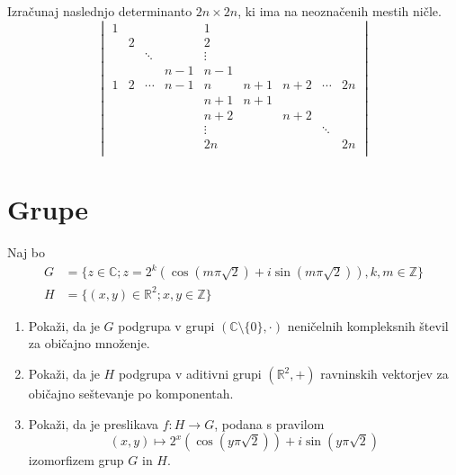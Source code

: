\documentclass[a4paper,12pt]{article}
\begin{document}
Izračunaj naslednjo determinanto \(2n \times 2n\), ki ima na neoznačenih mestih ničle.
\[
\begin{vmatrix}
    1 & & & & 1 & & & & \\
    & 2 & & & 2 & & & & \\
    & & \ddots & & \vdots & & & &\\
    & & & n-1 & n-1 & & &\\
    1 & 2 & \cdots & n-1 & n & n+1 & n+2 & \cdots & 2n \\
    & & & & n+1 & n+1 & & & \\
    & & & & n+2 & & n+2 & & \\
    & & & & \vdots & & & \ddots & \\
    & & & & 2n & & & & 2n \\

\end{vmatrix}
\]
%
%

\section*{Grupe}

Naj bo
\begin{align*}
    G&=\{z \in \mathbb{C}; z=2^k(\cos(m\pi \sqrt{2}) + i\sin(m\pi \sqrt{2})), k, m \in \mathbb{Z}\} \\
    H&=\{(x,y) \in \mathbb{R}^2; x, y \in \mathbb{Z}\}
\end{align*}
\begin{enumerate}
\item
Pokaži, da je \(G\) podgrupa v grupi \((\mathbb{C} \setminus \{0\}, \cdot)\)
neničelnih kompleksnih števil za običajno množenje.

\item
Pokaži, da je \(H\) podgrupa v aditivni grupi \((\mathbb{R}^2, +)\)
ravninskih vektorjev za običajno seštevanje po komponentah.

\item
Pokaži, da je preslikava \(f:H\to G\), podana s pravilom
\[
(x,y) \mapsto 2^x(\cos(y\pi \sqrt{2})) +i \sin (y \pi \sqrt{2})
\]
izomorfizem grup \(G\) in \(H\).
\end{enumerate}
\end{document}
